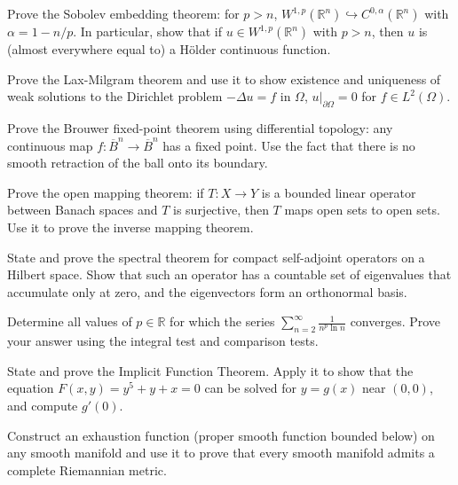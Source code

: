 \documentclass[12pt,a4paper]{exam}
\begin{document}
\begin{questions}
\question[3]
Prove the Sobolev embedding theorem: for $p > n$, $W^{1,p}(\mathbb{R}^n) \hookrightarrow C^{0,\alpha}(\mathbb{R}^n)$ with $\alpha = 1 - n/p$. In particular, show that if $u \in W^{1,p}(\mathbb{R}^n)$ with $p > n$, then $u$ is (almost everywhere equal to) a H\"older continuous function.

\vspace{0.3cm}

\question[6]
Prove the Lax-Milgram theorem and use it to show existence and uniqueness of weak solutions to the Dirichlet problem $-\Delta u = f$ in $\Omega$, $u|_{\partial\Omega} = 0$ for $f \in L^2(\Omega)$.

\vspace{0.3cm}

\question[5]
Prove the Brouwer fixed-point theorem using differential topology: any continuous map $f: \overline{B}^n \to \overline{B}^n$ has a fixed point. Use the fact that there is no smooth retraction of the ball onto its boundary.

\vspace{0.3cm}

\question[5]
Prove the open mapping theorem: if $T: X \to Y$ is a bounded linear operator between Banach spaces and $T$ is surjective, then $T$ maps open sets to open sets. Use it to prove the inverse mapping theorem.

\vspace{0.3cm}

\question[4]
State and prove the spectral theorem for compact self-adjoint operators on a Hilbert space. Show that such an operator has a countable set of eigenvalues that accumulate only at zero, and the eigenvectors form an orthonormal basis.

\vspace{0.3cm}

\question[4]
Determine all values of $p \in \mathbb{R}$ for which the series $\sum_{n=2}^{\infty} \frac{1}{n^p \ln n}$ converges. Prove your answer using the integral test and comparison tests.

\vspace{0.3cm}

\question[3]
State and prove the Implicit Function Theorem. Apply it to show that the equation $F(x,y) = y^5 + y + x = 0$ can be solved for $y = g(x)$ near $(0,0)$, and compute $g'(0)$.

\vspace{0.3cm}

\question[6]
Construct an exhaustion function (proper smooth function bounded below) on any smooth manifold and use it to prove that every smooth manifold admits a complete Riemannian metric.


\end{questions}
\end{document}
